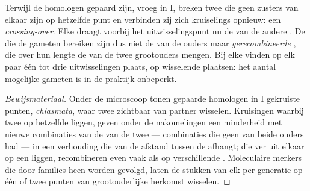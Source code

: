 \begin{proposition}\label{prop:g12:meiosis-genetic-shuffling:crossingover}
Terwijl de homologen gepaard zijn, vroeg in  I, breken twee
 die geen zusters van elkaar zijn op hetzelfde punt en
verbinden zij zich kruiselings opnieuw: een
\emph{crossing-over}. Elke  draagt voorbij
het uitwisselingspunt nu de  van de andere . De
 die de gameten bereiken zijn dus niet de  van de
ouders maar \emph{gerecombineerde} , die over hun lengte de
 van de twee grootouders mengen. Bij elke  vinden op elk
paar één tot drie uitwisselingen plaats, op wisselende plaatsen: het
aantal mogelijke gameten is in de praktijk onbeperkt.
\end{proposition}
\begin{proof}[Bewijsmateriaal]
Onder de microscoop tonen gepaarde homologen in  I gekruiste
punten, \emph{chiasmata}, waar twee  zichtbaar van partner
wisselen. Kruisingen waarbij twee  op hetzelfde  liggen,
geven onder de nakomelingen een minderheid met nieuwe combinaties van de
 van de twee  --- combinaties die geen van beide ouders had ---
in een verhouding die van de afstand tussen de  afhangt;  die
ver uit elkaar op een  liggen, recombineren even vaak als 
op verschillende . Moleculaire merkers die door families heen
worden gevolgd, laten de stukken van elk  per generatie op één
of twee punten van grootouderlijke herkomst wisselen.
\end{proof}

